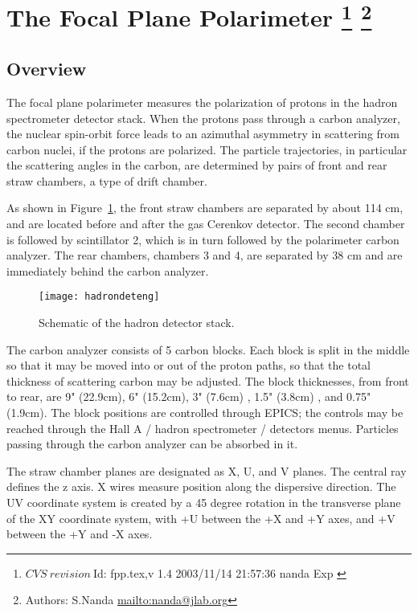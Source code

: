 \section[The Focal Plane Polarimeter]{The Focal Plane Polarimeter
\footnote{
  $CVS~revision~ $Id: fpp.tex,v 1.4 2003/11/14 21:57:36 nanda Exp $ $
}
\footnote{Authors: S.Nanda \url{mailto:nanda@jlab.org}}
}

\subsection{Overview}

The focal plane polarimeter measures the polarization of protons in the
hadron spectrometer detector stack.
When the protons pass through a carbon analyzer, the nuclear spin-orbit
force leads to an azimuthal asymmetry in scattering from carbon nuclei,
if the protons are polarized. 
The particle trajectories, in particular the
scattering angles in the carbon, are determined by pairs of front and rear
straw chambers, a type of drift chamber.

As shown in Figure~\ref{fig:hadron_det}, 
the front straw chambers are separated by about 114 cm, and are located
before and after the gas Cerenkov detector.
The second chamber is followed by scintillator 2, which is in turn
followed by the polarimeter carbon analyzer.
The rear chambers, chambers 3 and 4, are separated by 38 cm and are
immediately behind the carbon analyzer.

\begin{figure}[bth]
\begin{center}
\texttt{[image: hadrondeteng]}
{\linespread{1.}
\caption[Detectors: Hadron Arm detector]{Schematic of the hadron detector stack.}
\label{fig:hadron_det}}
\end{center}
\end{figure}

The carbon analyzer consists of 5 carbon blocks.
Each block is split in the middle so that it may be moved into or out
of the proton paths, so that the total thickness of scattering carbon may be
adjusted.
The block thicknesses, from front to rear, are 9" (22.9cm), 6" (15.2cm), 
3" (7.6cm) , 1.5" (3.8cm) , and 0.75" (1.9cm).
The block positions are controlled through EPICS; the controls
may be reached through the Hall A / hadron spectrometer / detectors menus.
Particles passing through the carbon analyzer can be absorbed in it.

The straw chamber planes are designated as X, U, and V planes.
The central ray defines the z axis.
X wires measure position along the dispersive direction.
The UV coordinate system is created by a 45 degree rotation in the
transverse plane of the XY coordinate system, with +U between the
+X and +Y axes, and +V between the +Y and -X axes.

